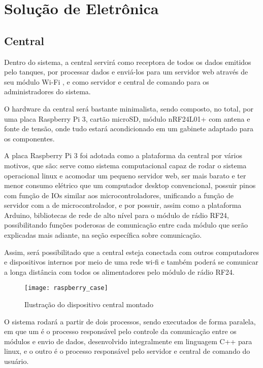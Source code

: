 
\section{Solução de Eletrônica}

\subsection{Central}

Dentro do sistema, a central servirá como receptora de todos os dados emitidos pelo tanques, por processar dados e enviá-los para um servidor web através de seu módulo Wi-Fi , e como servidor e central de comando para os administradores do sistema.

O hardware da central será bastante minimalista, sendo composto, no total, por uma placa Raspberry Pi 3, cartão microSD, módulo nRF24L01+ com antena e fonte de tensão, onde tudo estará acondicionado em um gabinete adaptado para os componentes.

A placa Raspberry Pi 3 foi adotada como a plataforma da central por vários motivos, que são: serve como sistema computacional capaz de rodar o sistema operacional linux e acomodar um pequeno servidor web, ser mais barato e ter menor consumo elétrico que um computador desktop convencional, possuir pinos com função de IOs similar aos microcontroladores, unificando a função de servidor com a de microcontrolador, e por possuir, assim como a plataforma Arduino, bibliotecas de rede de alto nível para o módulo de rádio RF24, possibilitando funções poderosas de comunicação entre cada módulo que serão explicadas mais adiante, na seção específica sobre comunicação.

Assim, será possibilitado que a central esteja conectada com outros computadores e dispositivos internos por meio de uma rede wi-fi e também poderá se comunicar a longa distância com todos os alimentadores pelo módulo de rádio RF24.

\begin{figure}[!h]
\centering \texttt{[image: raspberry\_case]}
\caption{Ilustração do dispositivo central montado}
\label{rasp}
\end{figure}

O sistema rodará a partir de dois processos,  sendo executados de forma paralela, em que um é o processo responsável pelo controle da comunicação entre os módulos e envio de dados, desenvolvido integralmente em linguagem C++ para linux, e o outro é o processo responsável pelo servidor e central de comando do usuário.

